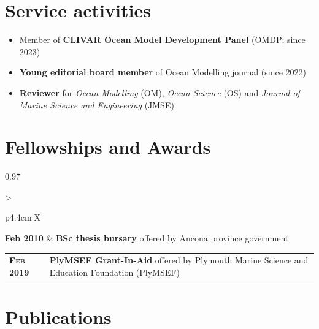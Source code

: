\documentclass[a4paper, oneside, final]{scrartcl}
\begin{document}

\section{Service activities}
\noindent
\normalsize
\begin{itemize}
	\item Member of \textbf{CLIVAR Ocean Model Development Panel} (OMDP; since 2023)
	\item \textbf{Young editorial board member} of Ocean Modelling journal (since 2022)
	\item \textbf{Reviewer} for \textit{Ocean Modelling} (OM), \textit{Ocean Science} (OS) and \textit{Journal of Marine Science and Engineering} (JMSE).
\end{itemize}
\section{Fellowships and Awards}
\noindent
\normalsize
\begin{tabularx}{0.97\linewidth}{>{\raggedright\scshape}p{4.4cm}|X}
	\textbf{Feb 2010}  & \textbf{BSc thesis bursary} offered by Ancona province government \\
\end{tabularx}

\begin{tabularx}{0.97\linewidth}{>{\raggedright\scshape}p{4.4cm}|X}
	\textbf{Feb 2019}  & \textbf{PlyMSEF Grant-In-Aid} offered by Plymouth Marine Science and Education Foundation (PlyMSEF) \\
\end{tabularx}



\section{Publications}
\noindent
\normalsize
    
\end{document}
